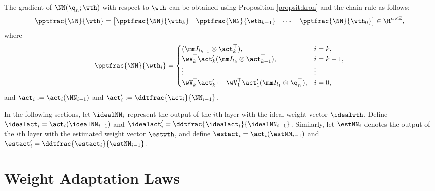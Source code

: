 \documentclass[letterpaper, journal]{IEEEtran}
\providecommand{\DIFadd}[1]{{\protect\color{blue}\uwave{#1}}} %
\providecommand{\DIFdel}[1]{{\protect\color{red}\sout{#1}}} %
\providecommand{\DIFaddbegin}{} %
\providecommand{\DIFaddend}{} %
\providecommand{\DIFdelbegin}{} %
\providecommand{\DIFdelend}{} %
\begin{document}
The gradient of $ \NN({\q}_n;\wth)$ with respect to $\wth$ can be obtained using Proposition \ref{propsit:kron} and the chain rule as follows:
\begin{equation}
    \pptfrac{\NN}{\wth}=
    \begin{bmatrix}
        \pptfrac{\NN}{\wth_k}&
        \pptfrac{\NN}{\wth_{k-1}}&
    \cdots &
        \pptfrac{\NN}{\wth_0}
    \end{bmatrix}
    \in\R^{n \times \Xi}
    ,
    \label{eq:gradient:phi}
\end{equation}
where
\begin{equation}
    \pptfrac{\NN}{\wth_i} = 
    \begin{cases}
        (
            \mm I_{l_{k+1}}
            \otimes 
            \act_{k}^\top  
        )
        , 
        &
        i=k
        ,
        \\
        \wV_k^\top\act_{k}' 
        (
            \mm I_{l_{k}}
            \otimes  
            \act_{k-1}^\top  
        )
        , 
        & 
        i=k-1
        ,
        \\
        \vdots 
        &
        \vdots 
        \\
        \wV_k^\top\act'_{k} 
        \cdots 
        \wV_1^\top\act_1' 
        (
            \mm I_{l_1}
            \otimes 
            {\q}_n^\top  
        )
        , 
        &
        i = 0
        ,
    \end{cases}
    \label{eq:NN:grad}
\end{equation}
and $\act_i:= \act_i(\NN_{i-1})$ and $\act_i':= \ddtfrac{\act_i}{\NN_{i-1}}$.

In the following sections, let $\idealNN_i$ represent the output of the $i$th layer with the ideal weight vector $\idealwth$. 
Define $\idealact_i=\act_i(\idealNN_{i-1})$ and ${\idealact}'_i= \ddtfrac{\idealact_i}{\idealNN_{i-1}}$. 
Similarly, let $\estNN_i$ \DIFdelbegin \DIFdel{denotes }\DIFdelend \DIFaddbegin \DIFadd{denote }\DIFaddend the output of the $i$th layer with the estimated weight vector $\estwth$, and define $\estact_i=\act_i(\estNN_{i-1})$ and $\estact_i'= \ddtfrac{\estact_i}{\estNN_{i-1}}$.

\section{Weight Adaptation Laws}\label{sec:adap_laws}

\end{document}
